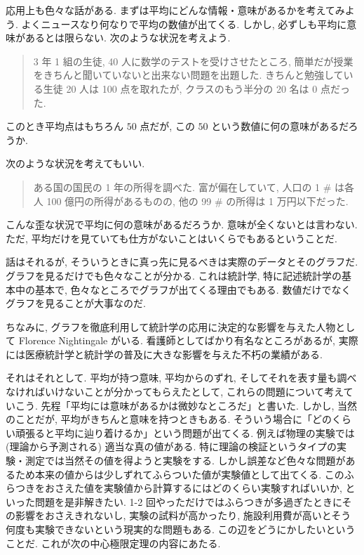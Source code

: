 \documentclass[openany, a4paper, oneside]{book}
\theoremstyle{break}
\theoremstyle{breakdefn}
\begin{document}
応用上も色々な話がある.
まずは平均にどんな情報・意味があるかを考えてみよう.
よくニュースなり何なりで平均の数値が出てくる.
しかし, 必ずしも平均に意味があるとは限らない.
次のような状況を考えよう.
\begin{quote}
3 年 1 組の生徒, 40 人に数学のテストを受けさせたところ,
簡単だが授業をきちんと聞いていないと出来ない問題を出題した.
きちんと勉強している生徒 20 人は 100 点を取れたが, クラスのもう半分の 20 名は 0 点だった.
\end{quote}

このとき平均点はもちろん $50$ 点だが, この $50$ という数値に何の意味があるだろうか.

次のような状況を考えてもいい.
\begin{quote}
ある国の国民の 1 年の所得を調べた.
富が偏在していて, 人口の 1 \#  は各人 100 億円の所得があるものの,
他の 99 \#  の所得は 1 万円以下だった.
\end{quote}

こんな歪な状況で平均に何の意味があるだろうか.
意味が全くないとは言わない.
ただ, 平均だけを見ていても仕方がないことはいくらでもあるということだ.

話はそれるが, そういうときに真っ先に見るべきは実際のデータとそのグラフだ.
グラフを見るだけでも色々なことが分かる.
これは統計学, 特に記述統計学の基本中の基本で, 色々なところでグラフが出てくる理由でもある.
数値だけでなくグラフを見ることが大事なのだ.

ちなみに, グラフを徹底利用して統計学の応用に決定的な影響を与えた人物として Florence Nightingale がいる.
看護師としてばかり有名なところがあるが, 実際には医療統計学と統計学の普及に大きな影響を与えた不朽の業績がある.

それはそれとして.
平均が持つ意味, 平均からのずれ, そしてそれを表す量も調べなければいけないことが分かってもらえたとして,
これらの問題について考えていこう.
先程「平均には意味があるかは微妙なところだ」と書いた.
しかし, 当然のことだが, 平均がきちんと意味を持つときもある.
そういう場合に「どのくらい頑張ると平均に辿り着けるか」という問題が出てくる.
例えば物理の実験では (理論から予測される) 適当な真の値がある.
特に理論の検証というタイプの実験・測定では当然その値を得ようと実験をする.
しかし誤差など色々な問題があるため本来の値からは少しずれてふらついた値が実験値として出てくる.
このふらつきをおさえた値を実験値から計算するにはどのくらい実験すればいいか, といった問題を是非解きたい.
1-2 回やっただけではふらつきが多過ぎたときにその影響をおさえきれないし,
実験の試料が高かったり, 施設利用費が高いとそう何度も実験できないという現実的な問題もある.
この辺をどうにかしたいということだ.
これが次の中心極限定理の内容にあたる.
\end{document}
